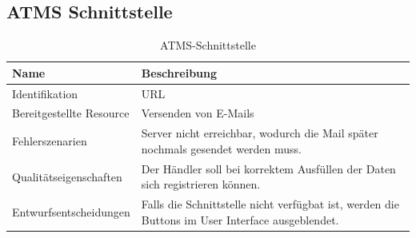 \subsection{ATMS Schnittstelle}

\begin{table}[H]
	\centering
	\caption{ATMS-Schnittstelle}
	\begin{tabular}{ | p{4cm} | p{11cm} | }
		\toprule
		{\textbf{Name}} & {\textbf{Beschreibung}} \\
		\midrule
		Identifikation & URL\\ \hline
		Bereitgestellte Resource & Versenden von E-Mails\\ \hline
		Fehlerszenarien & Server nicht erreichbar, wodurch die Mail später nochmals gesendet werden muss.\\ \hline
		Qualitätseigenschaften & Der Händler soll bei korrektem Ausfüllen der Daten sich registrieren können.\\ \hline
		Entwurfsentscheidungen & Falls die Schnittstelle nicht verfügbat ist, werden die Buttons im User Interface ausgeblendet.\\
		\bottomrule
	\end{tabular}
\end{table}

